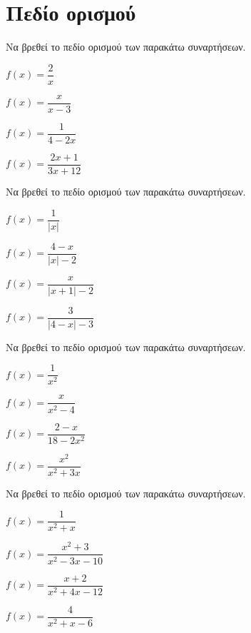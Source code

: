 \documentclass[11pt,a4paper,twocolumn]{article}
\begin{document}
\section{Πεδίο ορισμού}
\begin{askhseis}
\item Να βρεθεί το πεδίο ορισμού των παρακάτω συναρτήσεων.
\begin{multicols}{2}
\begin{alist}
\item $f(x)=\dfrac{2}{x}$
\item $f(x)=\dfrac{x}{x-3}$
\item $f(x)=\dfrac{1}{4-2x}$
\item $f(x)=\dfrac{2x+1}{3x+12}$
\end{alist}
\end{multicols}
\item Να βρεθεί το πεδίο ορισμού των παρακάτω συναρτήσεων.
\begin{multicols}{2}
\begin{alist}
\item $f(x)=\dfrac{1}{|x|}$
\item $f(x)=\dfrac{4-x}{|x|-2}$
\item $f(x)=\dfrac{x}{|x+1|-2}$
\item $f(x)=\dfrac{3}{|4-x|-3}$
\end{alist}
\end{multicols}
\item Να βρεθεί το πεδίο ορισμού των παρακάτω συναρτήσεων.
\begin{multicols}{2}
\begin{alist}
\item $f(x)=\dfrac{1}{x^2}$
\item $f(x)=\dfrac{x}{x^2-4}$
\item $f(x)=\dfrac{2-x}{18-2x^2}$
\item $f(x)=\dfrac{x^2}{x^2+3x}$
\end{alist}
\end{multicols}
\item Να βρεθεί το πεδίο ορισμού των παρακάτω συναρτήσεων.
\begin{multicols}{2}
\begin{alist}
\item $f(x)=\dfrac{1}{x^2+x}$
\item $f(x)=\dfrac{x^2+3}{x^2-3x-10}$
\item $f(x)=\dfrac{x+2}{x^2+4x-12}$
\item $f(x)=\dfrac{4}{x^2+x-6}$
\end{alist}

\end{multicols}
\end{askhseis}
\end{document}

